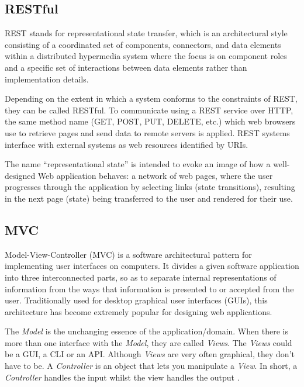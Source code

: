 \documentclass[numbers,numberedpars]{sigplanconf}
\begin{document}
\subsection{RESTful}

REST stands for representational state transfer, which is an architectural style consisting of a coordinated set of components, connectors, and data elements within a distributed hypermedia system where the focus is on component roles and a specific set 
of interactions between data elements rather than implementation details.

Depending on the extent in which a system conforms to the constraints of REST, they can be called RESTful. To communicate using a REST service over HTTP, the same method
name (GET, POST, PUT, DELETE, etc.) which web browsers use to retrieve pages and send data to remote servers is applied. REST systems interface with external systems as web resources identified by URIs.

The name ``representational state'' is intended to evoke an image of how a well-designed Web application behaves: a network of web pages, where the user progresses through the application by selecting links (state transitions), resulting in the next page (state) being transferred to the user and rendered for their use.



\subsection{MVC}

Model-View-Controller (MVC) is a software architectural pattern for implementing user interfaces on computers. It divides a given software application into three interconnected parts, so as to separate internal representations of information from the ways that information is presented to or accepted from the user. Traditionally used for desktop graphical user interfaces (GUIs), this architecture has become extremely
popular for designing web applications.

The {\it Model} is the unchanging essence of the application/domain. When there is more than one interface with the {\it Model}, they are called {\it Views}. The {\it Views} could be a GUI, a CLI or an API. Although {\it Views} are very often graphical, they don’t have to be. A {\it Controller} is an object that lets you manipulate a {\it View}. In short, a {\it Controller} handles the input whilst the view handles the output \citep{deacon2009model}.
\end{document}

